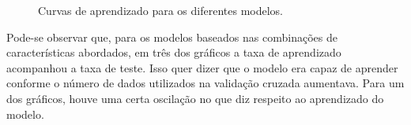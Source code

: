 \documentclass[conference]{IEEEtran}
\begin{document}
\begin{figure}[!h]
{{		}
	}
	\quad
	\quad
	\caption{Curvas de aprendizado para os diferentes modelos.}
	\label{fig:learningcurves}
\end{figure}

Pode-se observar que, para os modelos baseados nas combinações de características abordados, em três dos gráficos a taxa de aprendizado acompanhou a taxa de teste. Isso quer dizer que o modelo era capaz de aprender conforme o número de dados utilizados na validação cruzada aumentava. Para um dos gráficos, houve uma certa oscilação no que diz respeito ao aprendizado do modelo.
\end{document}
